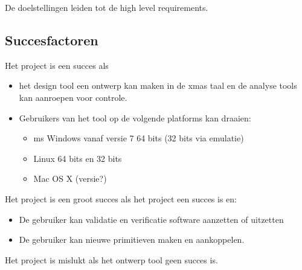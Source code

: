 De doelstellingen leiden tot de high level requirements.

\subsection{Succesfactoren}
Het project is een succes als

\begin{itemize}
 \item het design tool een ontwerp kan maken in de xmas taal en de analyse tools kan aanroepen voor controle.
 \item Gebruikers van het tool op de volgende platforms kan draaien:
 \begin{itemize}
    \item ms Windows vanaf versie 7 64 bits (32 bits via emulatie)
    \item Linux 64 bits en 32 bits
    \item Mac OS X (versie?)
 \end{itemize}
\end{itemize}

Het project is een groot succes als het project een succes is en:

\begin{itemize}
 \item De gebruiker kan validatie en verificatie software aanzetten of uitzetten
 \item De gebruiker kan nieuwe primitieven maken en aankoppelen.
\end{itemize}

Het project is mislukt als het ontwerp tool geen succes is.
